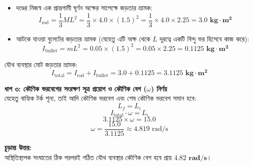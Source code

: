 \documentclass[12pt, a4paper]{article}
\begin{document}
\begin{tcolorbox}[solutionbox={সমাধান (Solution)}]
\begin{center}
\end{center}
\vspace{1em}

\begin{itemize}[leftmargin=*, parsep=0.4ex]
    \item দণ্ডের নিজস্ব এক প্রান্তগামী ঘূর্ণন অক্ষের সাপেক্ষে জড়তার ভ্রামক: 
    $$I_{\text{rod}} = \frac{1}{3} M L^2 = \frac{1}{3} \times 4.0 \times (1.5)^2 = \frac{1}{3} \times 4.0 \times 2.25 = \mathbf{3.0\text{ kg}\cdot\text{m}^2}$$
    \item আটকে যাওয়া বুলেটের জড়তার ভ্রামক (যেহেতু এটি অক্ষ থেকে $L$ দূরত্বে একটি বিন্দু ভর হিসেবে কাজ করে): 
    $$I_{\text{bullet}} = m L^2 = 0.05 \times (1.5)^2 = 0.05 \times 2.25 = \mathbf{0.1125\text{ kg}\cdot\text{m}^2}$$
\end{itemize}

যৌথ ব্যবস্থার মোট জড়তার ভ্রামক: 
$$I_{\text{total}} = I_{\text{rod}} + I_{\text{bullet}} = 3.0 + 0.1125 = \mathbf{3.1125\text{ kg}\cdot\text{m}^2}$$

\vspace{0.5em}
\noindent
\textbf{ধাপ ৩: কৌণিক ভরবেগের সংরক্ষণ সূত্র প্রয়োগ ও কৌণিক বেগ ($\omega$) নির্ণয়} \\
যেহেতু বাহ্যিক টর্ক শূন্য, তাই আদি কৌণিক ভরবেগ এবং শেষ কৌণিক ভরবেগ সমান হবে:
$$L_f = L_i$$ 
$$I_{\text{total}} \cdot \omega = L_i$$ 
$$3.1125 \times \omega = 15.0$$ 
$$\omega = \frac{15.0}{3.1125} \approx 4.819\text{ rad/s}$$

\vspace{1em}
\begin{tcolorbox}[answerbox]
\textbf{চূড়ান্ত উত্তর:} \\
অস্থিতিস্থাপক সংঘাতের ঠিক পরপরই গঠিত যৌথ ব্যবস্থার কৌণিক বেগ হবে প্রায় $\mathbf{4.82\text{ rad/s}}$।
\end{tcolorbox}
\end{tcolorbox}
\end{document}
